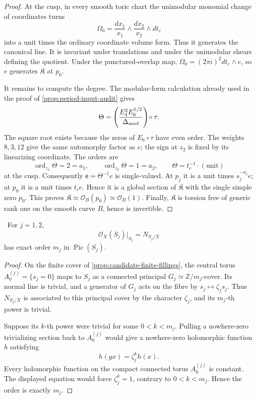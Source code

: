 \begin{proof}
At the cusp, in every smooth toric chart the unimodular monomial change of
coordinates turns
\[
 \Omega_0=\frac{dx_1}{x_1}\wedge
          \frac{dx_2}{x_2}\wedge dt_c
\]
into a unit times the ordinary coordinate volume form.  Thus it generates
the canonical line.  It is invariant under translations and under the
unimodular shears defining the quotient.  Under the punctured-overlap map,
\(\Omega_0=(2\pi i)^2dt_c\wedge e\), so \(e\) generates
\(\mathfrak K\) at \(p_0\).

It remains to compute the degree.  The modular-form calculation already
used in the proof of \cref{prop:period-input-audit} gives
\[
 \Theta=
 \left(\frac{E_4^2E_6^{1/2}}{\Delta_{\rm mod}}\right)\!\circ\tau.
\]
The square root exists because the zeros of \(E_6\circ\tau\) have even
order.  The weights \(8,3,12\) give the same automorphy factor as \(e\);
the sign at \(z_2\) is fixed by its linearizing coordinate.  The orders are
\[
 \operatorname{ord}_{z_1}\Theta=2=a_1,\qquad
 \operatorname{ord}_{z_2}\Theta=1=a_2,\qquad
 \Theta=t_c^{-1}\cdot(\text{unit})
\tag{9.6}
\]
at the cusp.  Consequently \(\mathsf e=\Theta^{-1}e\) is single-valued.
At \(p_j\) it is a unit times \(s_j^{-a_j}e\); at \(p_0\) it is a unit
times \(t_ce\).  Hence it is a global section of \(\mathfrak K\) with the
single simple zero \(p_0\).  This proves
\(\mathfrak K\simeq\mathcal O_B(p_0)\simeq\mathcal O_B(1)\).
Finally, \(\mathfrak K\) is torsion free of generic rank one on the smooth
curve \(B\), hence is invertible.
\end{proof}

\begin{lemma}
\label{lem:finite-normal-order-audit}
\Verified\ For \(j=1,2\),
\[
 \mathcal O_X(S_j)|_{S_j}=N_{S_j/X}
\]
has exact order \(m_j\) in \(\operatorname{Pic}(S_j)\).
\end{lemma}

\begin{proof}
On the finite cover of \cref{prop:candidate-finite-fillings}, the central
torus \(A_0^{(j)}=\{s_j=0\}\) maps to \(S_j\) as a connected principal
\(G_j\simeq\mathbb Z/m_j\)-cover.  Its normal line is trivial, and a
generator of \(G_j\) acts on the fibre by
\(s_j\mapsto\zeta_js_j\).  Thus \(N_{S_j/X}\) is associated to this
principal cover by the character \(\zeta_j\), and its \(m_j\)-th power is
trivial.

Suppose its \(k\)-th power were trivial for some \(0<k<m_j\).  Pulling a
nowhere-zero trivializing section back to \(A_0^{(j)}\) would give a
nowhere-zero holomorphic function \(h\) satisfying
\[
 h(gx)=\zeta_j^{k}h(x).
\]
Every holomorphic function on the compact connected torus \(A_0^{(j)}\)
is constant.  The displayed equation would force \(\zeta_j^k=1\), contrary
to \(0<k<m_j\).  Hence the order is exactly \(m_j\).
\end{proof}

